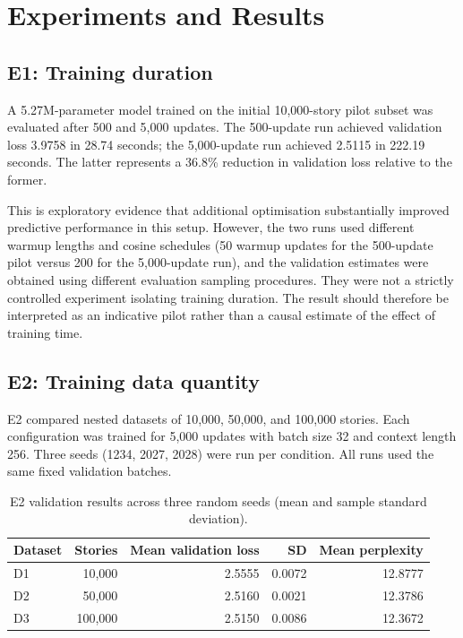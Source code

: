 \documentclass[10pt,a4paper]{article}
\begin{document}
\section{Experiments and Results}
\subsection{E1: Training duration}
A 5.27M-parameter model trained on the initial 10,000-story pilot subset was evaluated after 500 and 5,000 updates. The 500-update run achieved validation loss 3.9758 in 28.74 seconds; the 5,000-update run achieved 2.5115 in 222.19 seconds. The latter represents a 36.8\% reduction in validation loss relative to the former.

This is exploratory evidence that additional optimisation substantially improved predictive performance in this setup. However, the two runs used different warmup lengths and cosine schedules (50 warmup updates for the 500-update pilot versus 200 for the 5,000-update run), and the validation estimates were obtained using different evaluation sampling procedures. They were not a strictly controlled experiment isolating training duration. The result should therefore be interpreted as an indicative pilot rather than a causal estimate of the effect of training time.

\subsection{E2: Training data quantity}
E2 compared nested datasets of 10,000, 50,000, and 100,000 stories. Each configuration was trained for 5,000 updates with batch size 32 and context length 256. Three seeds (1234, 2027, 2028) were run per condition. All runs used the same fixed validation batches.

\begin{table}[H]
\centering
\caption{E2 validation results across three random seeds (mean and sample standard deviation).}
\begin{tabular}{lrrrr}
\toprule
Dataset & Stories & Mean validation loss & SD & Mean perplexity\\
\midrule
D1 & 10,000 & 2.5555 & 0.0072 & 12.8777\\
D2 & 50,000 & 2.5160 & 0.0021 & 12.3786\\
D3 & 100,000 & 2.5150 & 0.0086 & 12.3672\\
\bottomrule
\end{tabular}
\end{table}
\end{document}
